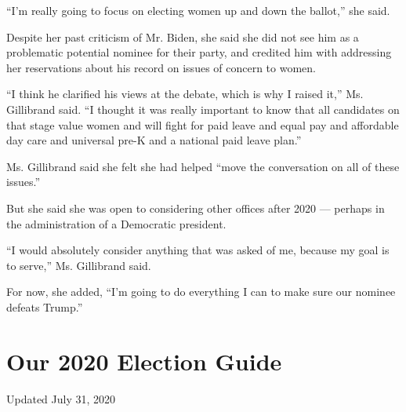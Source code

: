 ``I'm really going to focus on electing women up and down the ballot,''
she said.

Despite her past criticism of Mr. Biden, she said she did not see him as
a problematic potential nominee for their party, and credited him with
addressing her reservations about his record on issues of concern to
women.

``I think he clarified his views at the debate, which is why I raised
it,'' Ms. Gillibrand said. ``I thought it was really important to know
that all candidates on that stage value women and will fight for paid
leave and equal pay and affordable day care and universal pre-K and a
national paid leave plan.''

Ms. Gillibrand said she felt she had helped ``move the conversation on
all of these issues.''

But she said she was open to considering other offices after 2020 ---
perhaps in the administration of a Democratic president.

``I would absolutely consider anything that was asked of me, because my
goal is to serve,'' Ms. Gillibrand said.

For now, she added, ``I'm going to do everything I can to make sure our
nominee defeats Trump.''

\hypertarget{our-2020-election-guide}{%
\section{Our 2020 Election Guide}\label{our-2020-election-guide}}

Updated July 31, 2020

